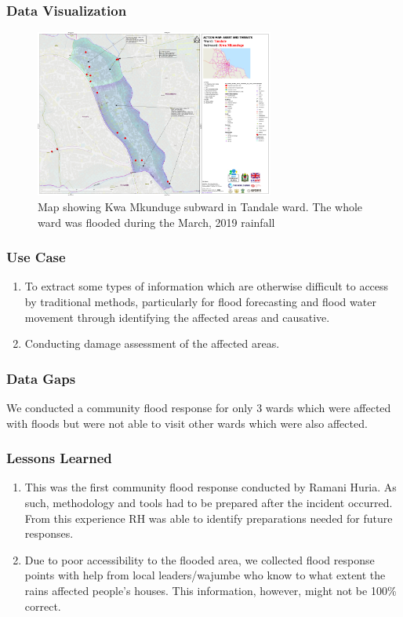 \documentclass[a4paper,12pt,twoside]{article}
\begin{document}
\subsubsection{Data Visualization}
\begin{figure}[h]
  \color{RHgreen}\caption{Map showing Kwa Mkunduge subward in Tandale ward. The whole ward was flooded during the March, 2019 rainfall}
  \centering
   \includegraphics[width=0.7\textwidth]{images/Flood_Response_Data_Viz.png}
\end{figure}

\subsubsection{Use Case}
\begin{enumerate}
    \item To extract some types of information which are otherwise difficult to access by traditional methods, particularly for flood forecasting and flood water movement through identifying the affected areas and causative.
    \item Conducting damage assessment of the affected areas.
\end{enumerate}

\subsubsection{Data Gaps}
We conducted a community flood response for only 3 wards which were affected with floods but were not able to visit other wards which were also affected.

\subsubsection{Lessons Learned}
\begin{enumerate}
    \item This was the first community flood response conducted by Ramani Huria. As such, methodology and tools had to be prepared after the incident occurred. From this experience RH was able to identify preparations needed for future responses.
    \item Due to poor accessibility to the flooded area, we collected flood response points with help from local leaders/wajumbe who know to what extent the rains affected people’s houses. This information, however, might not be 100\% correct.
\end{enumerate}
\end{document}
